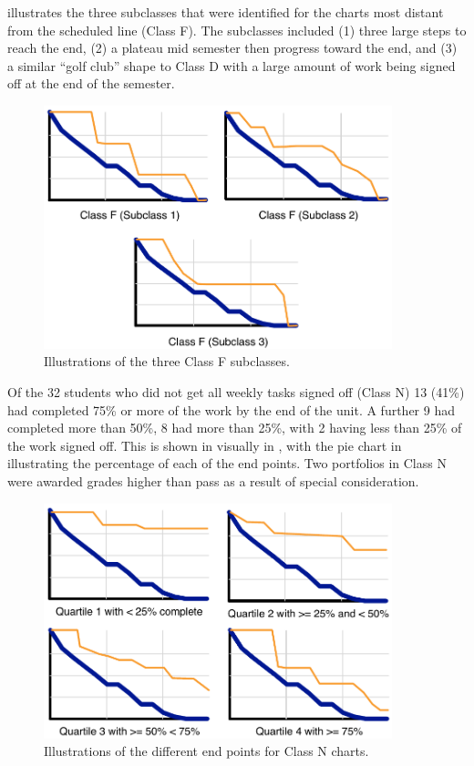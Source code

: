  illustrates the three subclasses that were identified for the charts most distant from the scheduled line (Class F). The subclasses included (1) three large steps to reach the end, (2) a plateau mid semester then progress toward the end, and (3) a similar ``golf club'' shape to Class D with a large amount of work being signed off at the end of the semester. 

\begin{figure}[htbp]
  \centering
  \includegraphics[width=0.9\textwidth]{ChartFSubclass}
  \caption{Illustrations of the three Class F subclasses.}
  \label{fig:f_subclass}
\end{figure}

Of the 32 students who did not get all weekly tasks signed off (Class N) 13 (41\%) had completed 75\% or more of the work by the end of the unit. A further 9 had completed more than 50\%, 8 had more than 25\%, with 2 having less than 25\% of the work signed off. This is shown in visually in , with the pie chart in  illustrating the percentage of each of the end points. Two portfolios in Class N were awarded grades higher than pass as a result of special consideration.

\begin{figure}[htbp]
  \centering
  \includegraphics[width=0.9\textwidth]{ChartNSubclass}
  \caption{Illustrations of the different end points for Class N charts.}
  \label{fig:n_subclass}
\end{figure}

